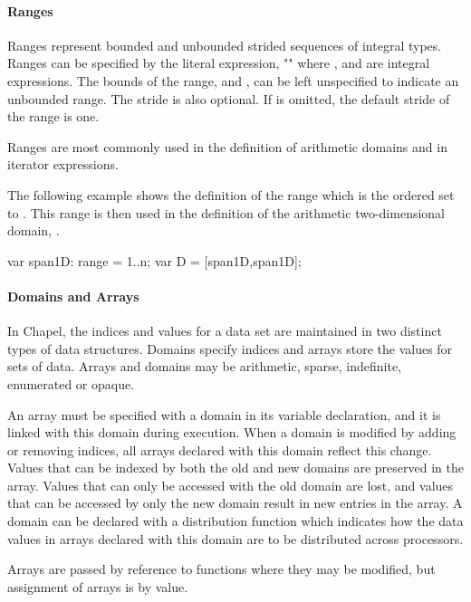 \paragraph{Ranges}
Ranges represent bounded and unbounded strided sequences of integral
types.  Ranges can be specified by the literal expression,
"" where ,
 and  are integral expressions.  The bounds
of the range,  and , can be left unspecified to
indicate an unbounded range.  The stride is also optional.
If  is omitted, the default stride of the range is
one.

Ranges are most commonly used in the definition of arithmetic domains
and in iterator expressions.

\begin{example}
The following example shows the definition of the range 
which is the ordered set  to .  This range is then
used in the definition of the arithmetic two-dimensional domain,
.
 
\begin{chapel}
var span1D: range = 1..n;
var D = [span1D,span1D];
\end{chapel}
\end{example}

\paragraph{Domains and Arrays}
In Chapel, the indices and values for a data set are maintained
in two distinct types of data structures.  Domains specify indices
and arrays store the values for sets of data.  Arrays and domains may
be arithmetic, sparse, indefinite, enumerated or opaque.

An array must be specified with a domain in its variable declaration, and 
it is linked with this domain during execution.
When a domain is modified by adding or removing indices, all arrays declared with
this domain reflect this change.  Values that can be indexed by both the
old and new domains are preserved in the array.  Values that can only be
accessed with the old domain are lost, and values that can be accessed by only
the new domain result in new entries in the array.
A domain can be declared with a distribution function which indicates how the 
data values in arrays declared with this domain are to be distributed across
processors.

Arrays are passed by reference to functions
where they may be modified, but assignment of arrays is by value.  

